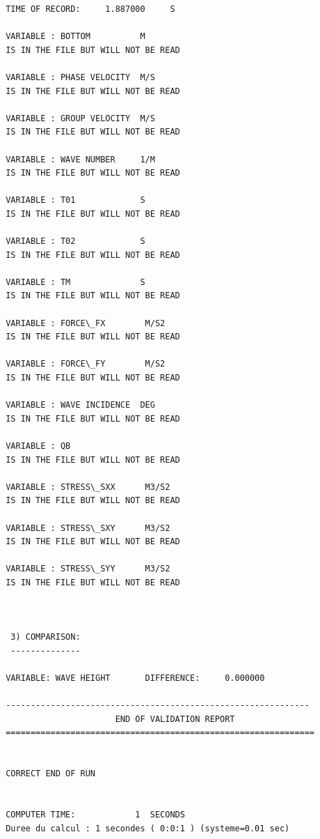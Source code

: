\begin{verbatim}
 TIME OF RECORD:     1.887000     S

 VARIABLE : BOTTOM          M
 IS IN THE FILE BUT WILL NOT BE READ

 VARIABLE : PHASE VELOCITY  M/S
 IS IN THE FILE BUT WILL NOT BE READ

 VARIABLE : GROUP VELOCITY  M/S
 IS IN THE FILE BUT WILL NOT BE READ

 VARIABLE : WAVE NUMBER     1/M
 IS IN THE FILE BUT WILL NOT BE READ

 VARIABLE : T01             S
 IS IN THE FILE BUT WILL NOT BE READ

 VARIABLE : T02             S
 IS IN THE FILE BUT WILL NOT BE READ

 VARIABLE : TM              S
 IS IN THE FILE BUT WILL NOT BE READ

 VARIABLE : FORCE\_FX        M/S2
 IS IN THE FILE BUT WILL NOT BE READ

 VARIABLE : FORCE\_FY        M/S2
 IS IN THE FILE BUT WILL NOT BE READ

 VARIABLE : WAVE INCIDENCE  DEG
 IS IN THE FILE BUT WILL NOT BE READ

 VARIABLE : QB
 IS IN THE FILE BUT WILL NOT BE READ

 VARIABLE : STRESS\_SXX      M3/S2
 IS IN THE FILE BUT WILL NOT BE READ

 VARIABLE : STRESS\_SXY      M3/S2
 IS IN THE FILE BUT WILL NOT BE READ

 VARIABLE : STRESS\_SYY      M3/S2
 IS IN THE FILE BUT WILL NOT BE READ



  3) COMPARISON:
  --------------

 VARIABLE: WAVE HEIGHT       DIFFERENCE:     0.000000

 -------------------------------------------------------------
                       END OF VALIDATION REPORT
 ==============================================================


 CORRECT END OF RUN


 COMPUTER TIME:            1  SECONDS
 Duree du calcul : 1 secondes ( 0:0:1 ) (systeme=0.01 sec)

\end{verbatim}
